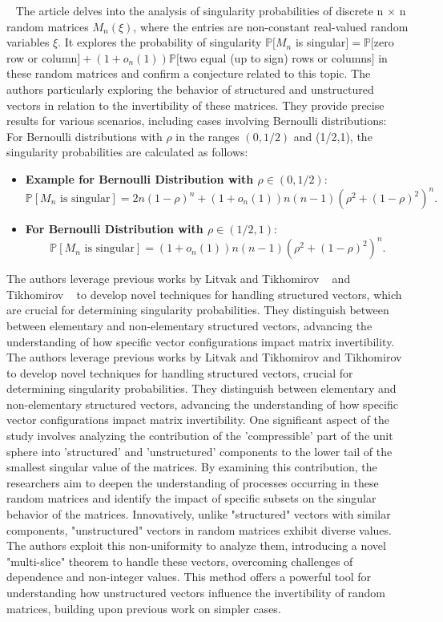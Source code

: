 ~\cite{jain2021singularity}
The article delves into the analysis of singularity probabilities of discrete n $\times$ n random matrices ${M_n}(\xi)$, where the entries are non-constant real-valued random variables $\xi$. 
It explores the probability of singularity $ \mathbb{P}[M_n$ is singular$]=\mathbb{P}[$zero row or column$]+ (1+o_n(1))\mathbb{P}[$two equal (up to sign) rows or columns$]$ in these random matrices and confirm a conjecture related to this topic. 
The authors particularly exploring the behavior of structured and unstructured vectors in relation to the invertibility of these matrices. 
They provide precise results for various scenarios, including cases involving Bernoulli distributions:\\
For Bernoulli distributions with $\rho$ in the ranges $(0,1/2)$ and (1/2,1), the singularity probabilities are calculated as follows:
\begin{itemize}
    \item \textbf{Example for Bernoulli Distribution with $\rho \in (0, 1/2)$}:
    \[
    \mathbb{P}[M_n \text{ is singular}] = 2n(1-\rho)^n + (1+o_n(1))n(n-1)(\rho^2+(1-\rho)^2)^n.
    \]
    \item \textbf{For Bernoulli Distribution with $\rho \in (1/2, 1)$}:
    \[
    \mathbb{P}[M_n \text{ is singular}] = (1+o_n(1))n(n-1)(\rho^2+(1-\rho)^2)^n.
    \]
\end{itemize}
The authors leverage previous works by Litvak and Tikhomirov ~\cite{litvak2022singularity} and Tikhomirov ~\cite{tikhomirov2020singularity} to develop novel techniques for handling structured vectors, which are crucial for determining singularity probabilities.
They distinguish between between elementary and non-elementary structured vectors, advancing the understanding of how specific vector configurations impact matrix invertibility.
The authors leverage previous works by Litvak and Tikhomirov and Tikhomirov to develop novel techniques for handling structured vectors, crucial for determining singularity probabilities. They distinguish between elementary and non-elementary structured vectors, advancing the understanding of how specific vector configurations impact matrix invertibility.
One significant aspect of the study involves analyzing the contribution of the 'compressible' part of the unit sphere into 'structured' and 'unstructured' components to the lower tail of the smallest singular value of the matrices. By examining this contribution, the researchers aim to deepen the understanding of processes occurring in these random matrices and identify the impact of specific subsets on the singular behavior of the matrices.
Innovatively, unlike "structured" vectors with similar components, "unstructured" vectors in random matrices exhibit diverse values. The authors exploit this non-uniformity to analyze them, introducing a novel "multi-slice" theorem to handle these vectors, overcoming challenges of dependence and non-integer values. This method offers a powerful tool for understanding how unstructured vectors influence the invertibility of random matrices, building upon previous work on simpler cases.

